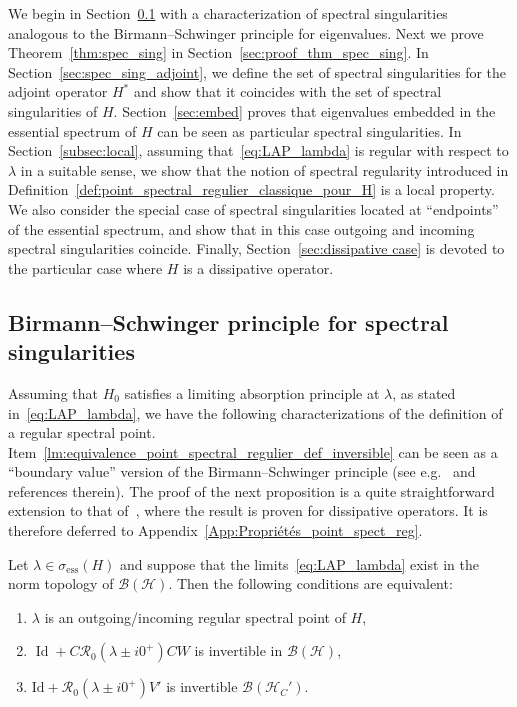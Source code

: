\documentclass[10pt]{amsart}
\theoremstyle{definition}\newtheorem{defi}[theo]{Definition}\newtheorem{rema}[theo]{Remark}\newtheorem{exam}[theo]{Example}\newtheorem{exem}[theo]{Example}\newtheorem{nota}[theo]{Notation}
\newcommand{\Hi}{\mathcal{H}}
\newcommand{\ess}{\mathrm{ess}}
\newcommand{\Res}{\mathcal{R}}
\newcommand{\clB}{\mathcal{B}}
\DeclareMathOperator{\Id}{Id}
\newcommand*{\romanenumi}{\renewcommand*{\theenumi}{\roman{enumi}}}
\begin{document}
We begin in Section~\ref{sec:Birmann} with a characterization of spectral singularities analogous to the Birmann--Schwinger principle for eigenvalues. Next we prove Theorem~\ref{thm:spec_sing} in Section~\ref{sec:proof_thm_spec_sing}. In Section~\ref{sec:spec_sing_adjoint}, we define the set of spectral singularities for the adjoint operator $H^*$ and show that it coincides with the set of spectral singularities of $H$. Section~\ref{sec:embed} proves that eigenvalues embedded in the essential spectrum of $H$ can be seen as particular spectral singularities. In Section~\ref{subsec:local}, assuming that~\eqref{eq:LAP_lambda} is regular with respect to $\lambda$ in a suitable sense, we show that the notion of spectral regularity introduced in Definition~\ref{def:point_spectral_regulier_classique_pour_H} is a local property. We also consider the special case of spectral singularities located at ``endpoints'' of the essential spectrum, and show that in this case outgoing and incoming spectral singularities coincide. Finally, Section~\ref{sec:dissipative case} is devoted to the particular case where $H$ is a dissipative operator.



\subsection{Birmann--Schwinger principle for spectral singularities}\label{sec:Birmann}


Assuming that $H_0$ satisfies a limiting absorption principle at $\lambda$, as stated in~\eqref{eq:LAP_lambda}, we have the following characterizations of the definition of a regular spectral point. Item~\eqref{lm:equivalence_point_spectral_regulier_def_inversible} can be seen as a ``boundary value'' version of the Birmann--Schwinger principle (see e.g.~\cite{BeELGE21_01,GeLaMiZi,HaKr22_01} and references therein). The proof of the next proposition is a quite straightforward extension to that of~\cite[Lemma~4.1]{FaNi18_01}, where the result is proven for dissipative operators. It is therefore deferred to Appendix~\ref{App:Propriétés_point_spect_reg}.


\begin{prop}\label{lm:equivalence_point_spectral_regulier}
Let $\lambda\in \sigma_\ess(H)$ and suppose that the limits~\eqref{eq:LAP_lambda} exist in the norm topology of $\clB(\Hi)$. Then the following conditions are equivalent:
\begin{enumerate}\romanenumi
\item\label{lm:equivalence_point_spectral_regulier_def_limite}
$\lambda$ is an outgoing/incoming regular spectral point of $H$,
\item\label{lm:equivalence_point_spectral_regulier_def_inversible}
$\Id+C\Res_0(\lambda\pm i0^+)CW$ is invertible in $\clB(\Hi)$,
\item\label{lm:equivalence_point_spectral_regulier_def_inversible H_C}
$\mathrm{Id}+\Res_0(\lambda\pm i0^+)V'$ is invertible $\clB(\Hi_C')$.
\end{enumerate}
\end{prop}
\end{document}
